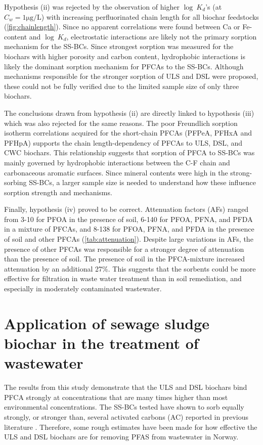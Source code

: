 Hypothesis (ii) was rejected by the observation of higher $\log~K_d$'s (at $C_w = 1 \mathrm{\mu g/L}$) with increasing perfluorinated chain length for all biochar feedstocks (\cref{fig:chainlength}). Since no apparent correlations were found between Ca or Fe-content and $\log~K_d$, electrostatic interactions are likely not the primary sorption mechanism for the SS-BCs. Since strongest sorption was measured for the biochars with higher porosity and carbon content, hydrophobic interactions is likely the dominant sorption mechanism for PFCAs to the SS-BCs. Although mechanisms responsible for the stronger sorption of ULS and DSL were proposed, these could not be fully verified due to the limited sample size of only three biochars. 

The conclusions drawn from hypothesis (ii) are directly linked to hypothesis (iii) which was also rejected for the same reasons. The poor Freundlich sorption isotherm correlations acquired for the short-chain PFCAs (PFPeA, PFHxA and PFHpA) supports the chain length-dependency of PFCAs to ULS, DSL, and CWC biochars. This relationship suggests that sorption of PFCA to SS-BCs was mainly governed by hydrophobic interactions between the C-F chain and carbonaceous aromatic surfaces. Since mineral contents were high in the strong-sorbing SS-BCs, a larger sample size is needed to understand how these influence sorption strength and mechanisms. 

Finally, hypothesis (iv) proved to be correct. Attenuation factors (AFs) ranged from 3-10 for PFOA in the presence of soil, 6-140 for PFOA, PFNA, and PFDA in a mixture of PFCAs, and 8-138 for PFOA, PFNA, and PFDA in the presence of soil and other PFCAs (\cref{tab:attenuation}). Despite large variations in AFs, the presence of other PFCAs was responsible for a stronger degree of attenuation than the presence of soil. The presence of soil in the PFCA-mixture increased attenuation by an additional 27\%. This suggests that the sorbents could be more effective for filtration in waste water treatment than in soil remediation, and especially in moderately contaminated wastewater. 

\section{Application of sewage sludge biochar in the treatment of wastewater \label{sec:application}}
The results from this study demonstrate that the ULS and DSL biochars bind PFCA strongly at concentrations that are many times higher than most environmental concentrations. The SS-BCs tested have shown to sorb equally strongly, or stronger than, several activated carbons (AC) reported in previous literature \citep{Kupryianchyk2016b, hansen2010sorption, silvani2019can}. Therefore, some rough estimates have been made for how effective the ULS and DSL biochars are for removing PFAS from wastewater in Norway. 

